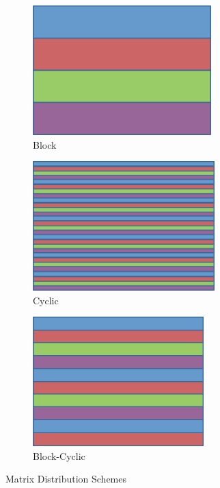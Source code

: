 \begin{figure}[ht]
        \centering
        \begin{subfigure}[b]{0.3\textwidth}
                \centering
                \includegraphics[height=5cm,width=\textwidth]{pbdDEMO-include/pics/dmat_block}
                \caption{Block}
        \end{subfigure}
        \hspace{.1cm}
        \begin{subfigure}[b]{0.3\textwidth}
                \centering
                \includegraphics[height=5cm,width=\textwidth]{pbdDEMO-include/pics/dmat_cyclic}
                \caption{Cyclic}
        \end{subfigure}
        \hspace{.01cm}
        \begin{subfigure}[b]{0.3\textwidth}
                \centering
                \includegraphics[height=5cm,width=\textwidth]{pbdDEMO-include/pics/dmat_blockcyclic}
                \caption{Block-Cyclic}
        \end{subfigure}
        \caption{Matrix Distribution Schemes}\label{fig:dmat1d}
\end{figure}


